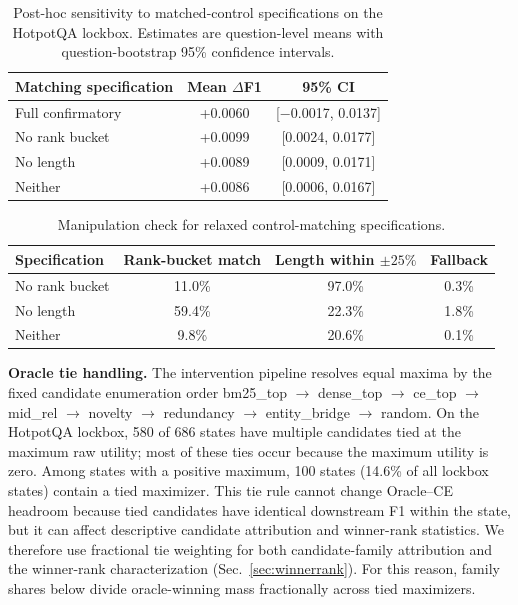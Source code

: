 \documentclass[10pt]{article}
\newcommand{\stitle}[1]{\vspace{0.4em}\noindent\textbf{#1}\hspace{0.6em}}
\begin{document}
\begin{table}[h]
\centering
\small
\caption{Post-hoc sensitivity to matched-control specifications on the
HotpotQA lockbox. Estimates are question-level means with question-bootstrap
95\% confidence intervals.}
\label{tab:matchspec}
\begin{tabular}{lcc}
\toprule
\textbf{Matching specification} & \textbf{Mean $\Delta$F1} & \textbf{95\% CI} \\
\midrule
Full confirmatory & +0.0060 & [$-$0.0017, 0.0137] \\
No rank bucket    & +0.0099 & [0.0024, 0.0177] \\
No length         & +0.0089 & [0.0009, 0.0171] \\
Neither           & +0.0086 & [0.0006, 0.0167] \\
\bottomrule
\end{tabular}
\end{table}

\begin{table}[h]
\centering
\small
\caption{Manipulation check for relaxed control-matching specifications.}
\label{tab:matchcheck}
\begin{tabular}{lccc}
\toprule
\textbf{Specification} & \textbf{Rank-bucket match} &
\textbf{Length within $\pm25\%$} & \textbf{Fallback} \\
\midrule
No rank bucket & 11.0\% & 97.0\% & 0.3\% \\
No length      & 59.4\% & 22.3\% & 1.8\% \\
Neither        & 9.8\%  & 20.6\% & 0.1\% \\
\bottomrule
\end{tabular}
\end{table}

\stitle{Oracle tie handling.}
The intervention pipeline resolves equal maxima by the fixed candidate
enumeration order bm25\_top $\to$ dense\_top $\to$ ce\_top $\to$ mid\_rel
$\to$ novelty $\to$ redundancy $\to$ entity\_bridge $\to$ random. On the
HotpotQA lockbox, 580 of 686 states have multiple candidates tied at the
maximum raw utility; most of these ties occur because the maximum utility is
zero. Among states with a positive maximum, 100 states (14.6\% of all
lockbox states) contain a tied maximizer. This tie rule cannot change
Oracle--CE headroom because tied candidates have identical downstream F1
within the state, but it can affect descriptive candidate attribution and
winner-rank statistics. We therefore use fractional tie weighting for both
candidate-family attribution and the winner-rank characterization
(Sec.~\ref{sec:winnerrank}). For this reason, family shares below divide
oracle-winning mass fractionally across tied maximizers.
\end{document}
